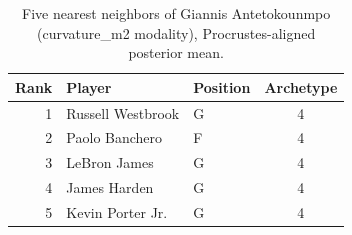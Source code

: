 \begin{table}[htbp]
  \centering\small
  \begin{tabular}{rllc}
    \toprule
    Rank & Player & Position & Archetype \\
    \midrule
    1 & Russell Westbrook & G & 4 \\
    2 & Paolo Banchero & F & 4 \\
    3 & LeBron James & G & 4 \\
    4 & James Harden & G & 4 \\
    5 & Kevin Porter Jr. & G & 4 \\
    \bottomrule
  \end{tabular}
  \caption{Five nearest neighbors of Giannis Antetokounmpo (curvature_m2 modality), Procrustes-aligned posterior mean.}
  \label{tab:Giannis_Antetokounmpo_neighbors_curvature_m2}
\end{table}

